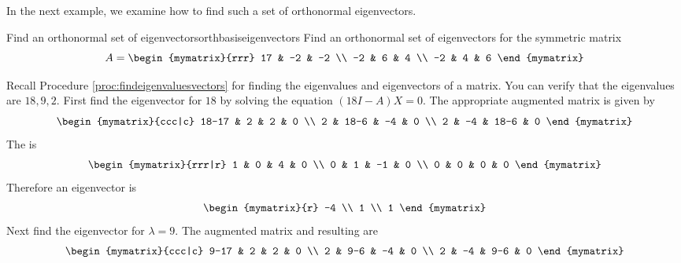 In the next example, we examine how to find such a set of orthonormal eigenvectors.

\begin{example}{Find an orthonormal set of eigenvectors}{orthbasiseigenvectors}
Find an orthonormal set of eigenvectors for the symmetric matrix
\begin{equation*}
A = \begin{mymatrix}{rrr}
17 & -2 & -2 \\
-2 & 6 & 4 \\
-2 & 4 & 6
\end{mymatrix}
\end{equation*}
\end{example}

\begin{solution}
Recall Procedure \ref{proc:findeigenvaluesvectors} for finding the eigenvalues and eigenvectors of a matrix. You can verify that the eigenvalues are $18,9,2.$ First find the eigenvector for $18$ by solving the equation $(18I-A)X = 0$. 
The appropriate augmented matrix is given by  
\begin{equation*}
\begin{mymatrix}{ccc|c}
18-17 & 2 & 2 & 0 \\ 
2 & 18-6 & -4 & 0 \\ 
2 & -4 & 18-6 & 0
\end{mymatrix}
\end{equation*}
The {\rref} is 
\begin{equation*}
\begin{mymatrix}{rrr|r}
1 & 0 & 4 & 0 \\ 
0 & 1 & -1 & 0 \\ 
0 & 0 & 0 & 0
\end{mymatrix}
\end{equation*}
Therefore an eigenvector is 
\begin{equation*}
\begin{mymatrix}{r}
-4 \\ 
1 \\ 
1
\end{mymatrix}
\end{equation*}
Next find the eigenvector for $\lambda =9.$ The augmented matrix and resulting {\rref} are 
\begin{equation*}
\begin{mymatrix}{ccc|c}
9-17 & 2 & 2 & 0 \\ 
2 & 9-6 & -4 & 0 \\ 
2 & -4 & 9-6 & 0
\end{mymatrix}

\end{equation*}
\end{solution}
